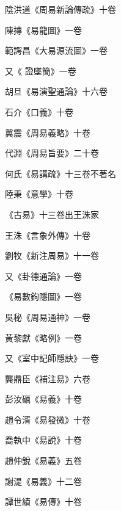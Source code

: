 \begin{pinyinscope}
 陰洪道《周易新論傳疏》十卷



 陳摶《易龍圖》一卷



 範諤昌《大易源流圖》一卷



 又《
 證墜簡》一卷



 胡旦《易演聖通論》十六卷



 石介《口義》十卷



 冀震《周易義略》十卷



 代淵《周易旨要》二十卷



 何氏《易講疏》十三卷不著名



 陸秉《意學》十卷



 《古易》十三卷出王洙家



 王洙《言象外傳》十卷



 劉牧《新注周易》十一卷



 又《卦德通論》一卷



 《易數鉤隱圖》一卷



 吳秘《周易通神》一卷



 黃黎獻《略例》一卷



 又《室中記師隱訣》一卷



 龔鼎臣《補注易》六卷



 彭汝礪《易義》十卷



 趙令湑《易發微》十卷



 喬執中《易說》十卷



 趙仲銳《易義》五卷



 謝湜《易義》十二卷



 譚世績《易傳》十卷




\end{pinyinscope}
